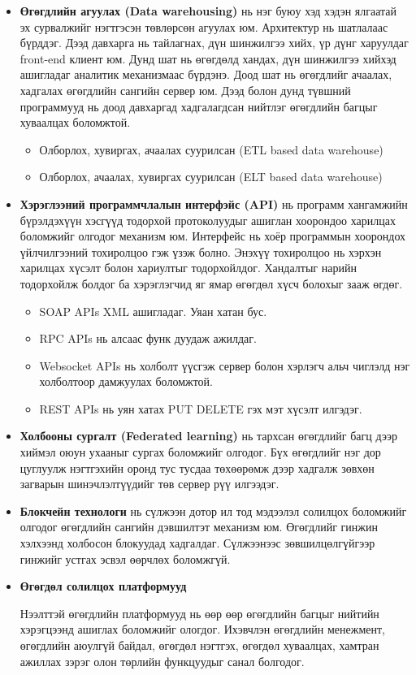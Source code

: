 \begin{itemize}
    \item \textbf{Өгөгдлийн агуулах (Data warehousing)} нь нэг буюу хэд хэдэн ялгаатай эх сурвалжийг нэгтгэсэн төвлөрсөн агуулах юм. Архитектур нь шатлалаас бүрддэг. Дээд давхарга нь тайлагнах, дүн шинжилгээ хийх, үр дүнг харуулдаг front-end клиент юм. Дунд шат нь өгөгдөлд хандах, дүн шинжилгээ хийхэд ашигладаг аналитик механизмаас бүрдэнэ. Доод шат нь өгөгдлийг ачаалах, хадгалах өгөгдлийн сангийн сервер юм. Дээд болон дунд түвшний программууд нь доод давхаргад хадгалагдсан нийтлэг өгөгдлийн багцыг хуваалцах боломжтой.
    \begin{itemize}
        \item Олборлох, хувиргах, ачаалах суурилсан (ETL based data warehouse)
        \item Олборлох, ачаалах, хувиргах суурилсан (ELT based data warehouse)
    \end{itemize}

    \item \textbf{Хэрэглээний программчлалын интерфэйс (API)} нь программ хангамжийн бүрэлдэхүүн хэсгүүд тодорхой протоколуудыг ашиглан хоорондоо харилцах боломжийг олгодог механизм юм. Интерфейс нь хоёр программын хоорондох үйлчилгээний тохиролцоо гэж үзэж болно. Энэхүү тохиролцоо нь хэрхэн харилцах хүсэлт болон хариултыг тодорхойлдог. Хандалтыг нарийн тодорхойлж болдог ба хэрэглэгчид яг ямар өгөгдөл хүсч болохыг зааж өгдөг.
    \begin{itemize}
        \item SOAP APIs XML ашигладаг. Уяан хатан бус.
        \item RPC APIs нь алсаас функ дуудаж ажилдаг.
        \item Websocket APIs нь холболт үүсгэж сервер болон хэрлэгч альч чиглэлд нэг холболтоор дамжуулах боломжтой.
        \item REST APIs нь уян хатах PUT DELETE гэх мэт хүсэлт илгэдэг.
    \end{itemize}
    
    \item \textbf{Холбооны сургалт (Federated learning)} нь тархсан өгөгдлийг багц дээр хиймэл оюун ухааныг сургах боломжийг олгодог. Бүх өгөгдлийг нэг дор цуглуулж нэгтгэхийн оронд тус тусдаа төхөөрөмж дээр хадгалж зөвхөн загварын шинэчлэлтүүдийг төв сервер рүү илгээдэг.

    \item \textbf{Блокчейн технологи} нь сүлжээн дотор ил тод мэдээлэл солилцох боломжийг олгодог өгөгдлийн сангийн дэвшилтэт механизм юм. Өгөгдлийг гинжин хэлхээнд холбосон блокуудад хадгалдаг. Сүлжээнээс зөвшилцөлгүйгээр гинжийг устгах эсвэл өөрчлөх боломжгүй.

    \item \textbf{Өгөгдөл солилцох платформууд}
    
    Нээлттэй өгөгдлийн платформууд нь өөр өөр өгөгдлийн багцыг нийтийн хэрэгцээнд ашиглах боломжийг ологдог. Ихэвчлэн өгөгдлийн менежмент, өгөгдлийн аюулгүй байдал, өгөгдөл нэгтгэх, өгөгдөл хуваалцах, хамтран ажиллах зэрэг олон төрлийн функцуудыг санал болгодог.


\end{itemize}

